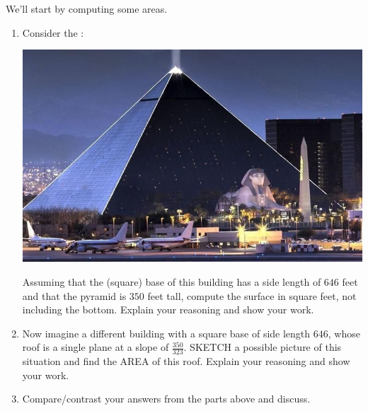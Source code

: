 \documentclass[hints,nooutcomes,noauthor,handout]{ximera}
\begin{document}
\begin{question} We'll start by computing some areas.
\begin{enumerate}
\item Consider the :
  \begin{center}
    \includegraphics[width=.4\textwidth]{pyramid.jpg} 
  \end{center}
 Assuming that the (square) base of this building has a side length of
 $646$ feet and that the pyramid is $350$ feet tall, compute the
 surface in square feet, not including the bottom. Explain your
 reasoning and show your work.
\item Now imagine a different building with a square base of side
  length $646$, whose roof is a single plane at a slope of
  $\tfrac{350}{323}$. SKETCH a possible picture of this situation and
  find the AREA of this roof. Explain your reasoning and show your
  work.

\item Compare/contrast your answers from the parts above and discuss. 
\end{enumerate}
\end{question}
 
 \mynewpage
 
\end{document}
